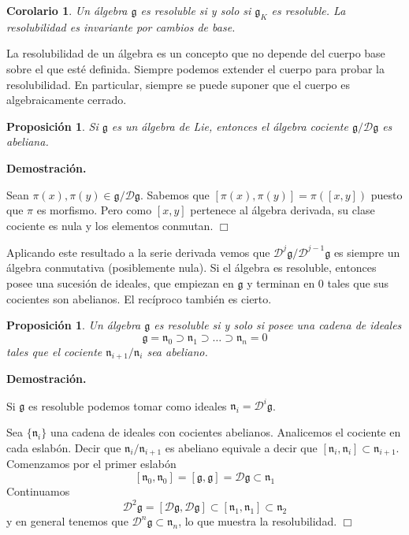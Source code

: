 \documentclass[a4paper,draft,12pt]{scrartcl}
\newtheorem{propo}[teo]{Proposición}%
\newtheorem{cor}[teo]{Corolario}%
\newcommand{\dem}{\noindent \textbf{Demostración. }\vspace{0.3 cm}}%
\newcommand{\g}{\mathfrak{g}}%
\newcommand{\fin}{ $\Box $ \vspace{0.4 cm}}
\newcommand{\D}{\mathcal{D}}%
\begin{document}
\begin{cor}

Un álgebra $\g$ es resoluble si y solo si $\g_K$ es resoluble.  La resolubilidad es invariante por cambios de base.

\end{cor}

La resolubilidad de un álgebra es un concepto que no depende del cuerpo base sobre el que esté definida.  Siempre podemos extender el cuerpo para probar la resolubilidad.  En particular, siempre se puede suponer que el cuerpo es algebraicamente cerrado.



\begin{propo}

Si $\g$ es un álgebra de Lie, entonces el álgebra cociente $\g/\D\g$ es abeliana.

\end{propo}

\dem

Sean $\pi(x), \pi(y) \in \g/\D\g$. Sabemos que $[\pi(x),\pi(y)]= \pi([x,y])$ puesto que $\pi$ es morfismo.  Pero como $[x,y]$ pertenece al álgebra derivada, su clase cociente es nula y los elementos conmutan. \fin

Aplicando este resultado a la serie derivada vemos que $\D^j\g/\D^{j-1}\g$ es siempre un álgebra conmutativa (posiblemente nula).  Si el álgebra es resoluble, entonces posee una sucesión de ideales, que empiezan en $\g$ y terminan en $0$ tales que sus cocientes son abelianos.  El recíproco también es cierto.

\begin{propo}

Un álgebra $\g$ es resoluble si y solo si posee una cadena de ideales
$$
\g =\mathfrak{n}_0 \supset \mathfrak{n}_1 \supset \dots \supset \mathfrak{n}_n=0
$$
tales que el cociente $\mathfrak{n}_{i+1}/\mathfrak{n}_i$ sea abeliano.

\end{propo}

\dem

Si $\g$ es resoluble podemos tomar como ideales $\mathfrak{n}_i = \D^i\g$.

\bigskip

Sea $\{\mathfrak{n}_i\}$ una cadena de ideales con cocientes abelianos.  Analicemos el cociente en cada eslabón.  Decir que $\mathfrak{n}_{i}/\mathfrak{n}_{i+1}$ es abeliano equivale a decir que $[\mathfrak{n}_i,\mathfrak{n}_i]\subset \mathfrak{n}_{i+1}$.  Comenzamos por el primer eslabón
$$
[\mathfrak{n}_0,\mathfrak{n}_0]=[\g,\g]=\D\g\subset \mathfrak{n}_1
$$
Continuamos
$$
\D^2 \g = [\D \g,\D\g] \subset [\mathfrak{n}_1,\mathfrak{n}_1]\subset \mathfrak{n}_2
$$
y en general tenemos que $\D^n\g \subset \mathfrak{n}_n$, lo que muestra la resolubilidad.  \fin
\end{document}
